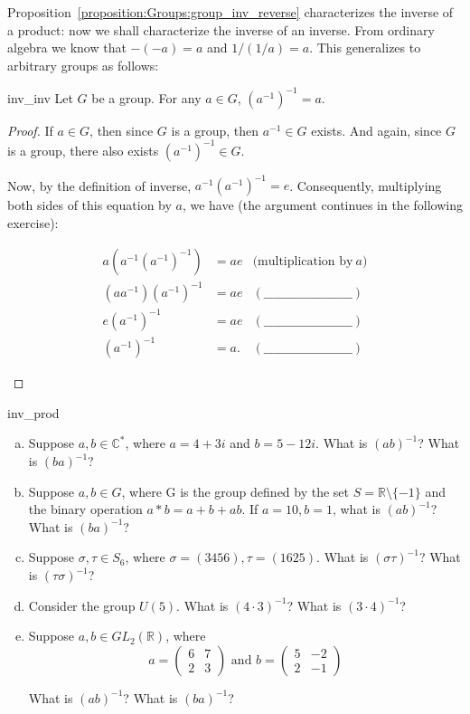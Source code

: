 Proposition~\ref{proposition:Groups:group_inv_reverse} characterizes the inverse of a product: now we shall characterize the inverse of an inverse. From ordinary algebra we know that $-(-a) = a$ and $1/(1/a) = a$. This generalizes to arbitrary groups as follows:

\begin{prop}{inv_inv}
Let $G$ be a group.  For any $a \in G$, $(a^{-1})^{-1} = a$.
\end{prop}
 
\begin{proof}
If $a \in G$, then since $G$ is a group, then $a^{-1} \in G$ exists.  And again, since $G$ is a group, there also exists $(a^{-1})^{-1} \in G$.

Now, by the definition of inverse, $a^{-1} (a^{-1})^{-1} = e$. Consequently, multiplying both sides of this equation by $a$, we have  (the argument continues in the following exercise):

\begin{exercise}{44}
\begin{align*}
a(a^{-1}(a^{-1})^{-1}) & = ae &\mbox{(multiplication by}~a)\\
(aa^{-1})(a^{-1})^{-1} & = ae   &(\_\_\_\_\_\_\_\_\_\_\_\_\_\_\_\_\_\_\_\_\_) \\
e(a^{-1})^{-1} & = ae   &(\_\_\_\_\_\_\_\_\_\_\_\_\_\_\_\_\_\_\_\_\_) \\
(a^{-1})^{-1} &= a.  &(\_\_\_\_\_\_\_\_\_\_\_\_\_\_\_\_\_\_\_\_\_)
\end{align*}
\end{exercise}
\end{proof}

\begin{exercise}{inv_prod}
\begin{enumerate}[(a)]
\item
Suppose $a,b \in {\mathbb C}^{\ast}$, where $a = 4 + 3i$ and $b = 5 - 12i$.  What is $(ab)^{-1}$?  What is $(ba)^{-1}$?
\item
Suppose $a,b \in G$, where G is the group defined by the set $S = {\mathbb R} \setminus \{ -1 \}$ and the binary operation $a \ast b = a + b +ab$.  If $a = 10, b = 1$, what is $(ab)^{-1}$?  What is $(ba)^{-1}$?
\item
Suppose $\sigma, \tau \in S_6$, where $\sigma = (3456), \tau = (1625)$.  What is $(\sigma \tau)^{-1}$?  What is $(\tau \sigma)^{-1}$?
\item
Consider the group $U(5)$.  What is $(4 \cdot 3)^{-1}$?  What is $(3 \cdot 4)^{-1}$?
\item
Suppose $a, b \in GL_2({\mathbb R})$, where
\[
a = \begin{pmatrix}
6 & 7 \\
2 & 3
\end{pmatrix} \mbox{ and }
b = \begin{pmatrix}
5 & -2 \\
2 & -1
\end{pmatrix} \]

What is $(ab)^{-1}$?  What is $(ba)^{-1}$?
\end{enumerate}
\end{exercise}{}

